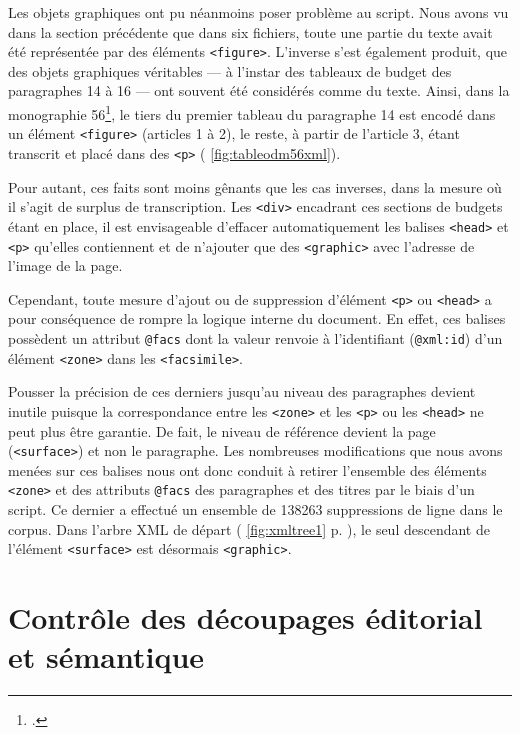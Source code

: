 Les objets graphiques ont pu néanmoins poser problème au script. Nous avons vu dans la section précédente que dans six fichiers, toute une partie du texte avait été représentée par des éléments \texttt{<figure>}. L'inverse s'est également produit, \cad{} que des objets graphiques véritables --- à l'instar des tableaux de budget des paragraphes 14 à 16 --- ont souvent été considérés comme du texte. Ainsi, dans la monographie \no{} 56\footcite{mono056a}, le tiers du premier tableau du paragraphe 14 est encodé dans un élément \texttt{<figure>} (articles 1 à 2), le reste, à partir de l'article 3, étant transcrit et placé dans des \texttt{<p>} (\fig{} \ref{fig:tableodm56xml}).

Pour autant, ces faits sont moins gênants que les cas inverses, dans la mesure où il s'agit de surplus de transcription. Les \texttt{<div>} encadrant ces sections de budgets étant en place, il est envisageable d'effacer automatiquement les balises \texttt{<head>} et \texttt{<p>} qu'elles contiennent et de n'ajouter que des \texttt{<graphic>} avec l'adresse de l'image de la page.

Cependant, toute mesure d'ajout ou de suppression d'élément \texttt{<p>} ou \texttt{<head>} a pour conséquence de rompre la logique interne du document. En effet, ces balises possèdent un attribut \texttt{@facs} dont la valeur renvoie à l'identifiant (\texttt{@xml:id}) d'un élément \texttt{<zone>} dans les \texttt{<facsimile>}.

Pousser la précision de ces derniers jusqu'au niveau des paragraphes devient inutile puisque la correspondance entre les \texttt{<zone>} et les \texttt{<p>} ou les \texttt{<head>} ne peut plus 
être garantie. De fait, le niveau de référence devient la page (\texttt{<surface>}) et non le paragraphe. Les nombreuses modifications que nous avons menées sur ces balises nous ont donc conduit à retirer l'ensemble des éléments \texttt{<zone>} et des attributs \texttt{@facs} des paragraphes et des titres par le biais d'un script. Ce dernier a effectué un ensemble de 138263 suppressions de ligne dans le corpus. Dans l'arbre XML de départ (\fig{} \ref{fig:xmltree1} p. \pageref{fig:xmltree1}), le seul descendant de l'élément \texttt{<surface>} est désormais \texttt{<graphic>}.

\newpage
\thispagestyle{empty}
\mbox{}
\newpage

\chapter[Découpages éditorial et sémantique]{Contrôle des découpages éditorial et sémantique}

